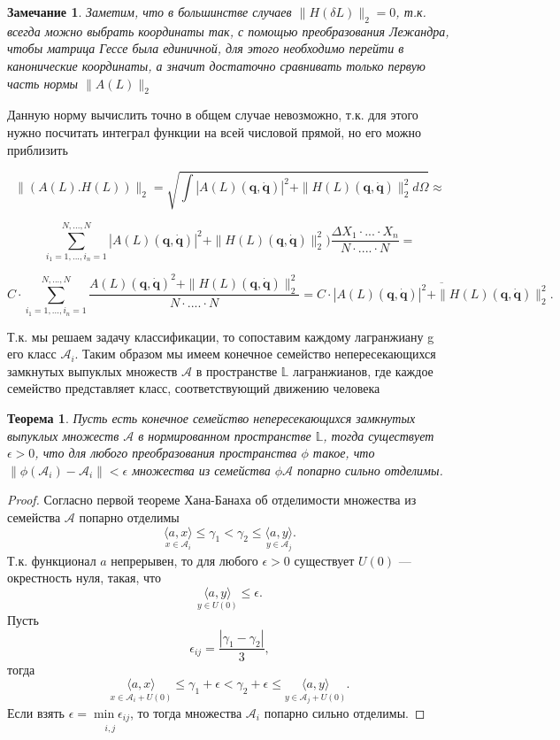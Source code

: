 \documentclass[12pt, twoside]{article}
\newtheorem{remark}{Замечание}
\newtheorem{theorem}{Теорема}
\begin{document}
\begin{remark} \label{remark3}
Заметим, что в большинстве случаев  $\|H(\delta L)\|_2 = 0$, т.к. всегда можно выбрать координаты так, с помощью преобразования Лежандра, чтобы матрица Гессе была единичной, для этого необходимо перейти в канонические координаты, а значит достаточно сравнивать только первую часть нормы $\|A(L)\|_2$
\end{remark}

Данную норму вычислить точно в общем случае невозможно, т.к. для этого нужно посчитать интеграл функции на всей числовой прямой, но его можно приблизить

$$\|(A(L). H(L))\|_2 = \sqrt{\int |A(L)\left(\mathbf{q}, \dot{\mathbf{q}}\right)|^2 + \|H(L)\left(\mathbf{q}, \dot{\mathbf{q}}\right)\|_2^2  d\Omega} \approx$$

$$\sum_{i_1 = 1, ..., i_n = 1}^{N, ..., N} |A(L)\left(\mathbf{q}, \dot{\mathbf{q}}\right)|^2  + \|H(L)\left(\mathbf{q}, \dot{\mathbf{q}}\right)\|_2^2) \frac{\Delta X_1 \cdot ... \cdot X_n}{N \cdot .... \cdot N} =$$

$$ C \cdot \sum_{i_1 = 1, ..., i_n = 1}^{N, ..., N} \frac{A(L)\left(\mathbf{q}, \dot{\mathbf{q}}\right)^2 + \|H(L)\left(\mathbf{q}, \dot{\mathbf{q}}\right)\|_2^2}{N \cdot .... \cdot N} =  C \cdot \overline{|A(L)\left(\mathbf{q}, \dot{\mathbf{q}}\right)|^2 + \|H(L)\left(\mathbf{q}, \dot{\mathbf{q}}\right)\|_2^2}.$$

Т.к. мы решаем задачу классификации, то сопоставим каждому лагранжиану g его класс $\mathcal{A}_{i}$. Таким образом мы имеем конечное семейство непересекающихся замкнутых выпуклых множеств $\mathcal{A}$ в пространстве  $\mathbb{L}$ лагранжианов, где каждое семейство представляет класс, соответствующий движению человека

\begin{theorem} \label{main_theorem}
Пусть есть конечное семейство непересекающихся замкнутых выпуклых множеств $\mathcal{A}$ в нормированном пространстве $\mathbb{L}$, тогда существует $\epsilon > 0$, что для любого преобразования пространства $\phi$ такое, что $\|\phi(\mathcal{A}_{i}) - \mathcal{A}_{i}\| < \epsilon$ множества из семейства $\phi{\mathcal{A}}$ попарно сильно отделимы.
\end{theorem}

\begin{proof}
Согласно первой теореме Хана-Банаха об отделимости множества из семейства $\mathcal{A}$ попарно отделимы
\[ 
\underset{x \in \mathcal{A}_{i}}{\langle a, x \rangle}\leq \gamma_{1} < \gamma_{2} \leq \underset{y \in \mathcal{A}_{j}}{\langle a, y \rangle}.
\]
Т.к. функционал $a$ непрерывен, то для любого $\epsilon > 0$ существует $U(0)$ — окрестность нуля, такая, что 
\[
\underset{y \in U(0)}{\langle a, y \rangle} \leq \epsilon.
\]
Пусть 
\[
\epsilon_{ij} = \frac{|\gamma_{1} - \gamma_{2}|}{3},\]
тогда
\[
\underset{x \in \mathcal{A}_{i} + U(0)}{\langle a, x \rangle}\leq \gamma_{1} + \epsilon < \gamma_{2} + \epsilon \leq \underset{y \in \mathcal{A}_{j} + U(0)}{\langle a, y \rangle}.\]
Если взять $\epsilon = \underset{i, j}{\min{\epsilon_{ij}}}$, то тогда множества $\mathcal{A}_{i}$ попарно сильно отделимы. 
\end{proof}
\end{document}
